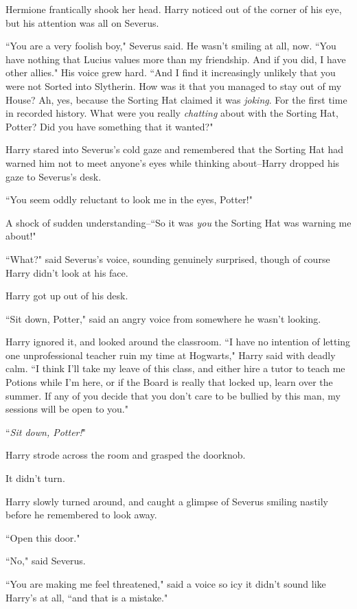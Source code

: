 Hermione frantically shook her head. Harry noticed out of the corner of his eye, but his attention was all on Severus.

``You are a very foolish boy," Severus said. He wasn't smiling at all, now. ``You have nothing that Lucius values more than my friendship. And if you did, I have other allies." His voice grew hard. ``And I find it increasingly unlikely that you were not Sorted into Slytherin. How was it that you managed to stay out of my House? Ah, yes, because the Sorting Hat claimed it was \emph{joking}. For the first time in recorded history. What were you really \emph{chatting} about with the Sorting Hat, Potter? Did you have something that it wanted?"

Harry stared into Severus's cold gaze and remembered that the Sorting Hat had warned him not to meet anyone's eyes while thinking about\---Harry dropped his gaze to Severus's desk.

``You seem oddly reluctant to look me in the eyes, Potter!"

A shock of sudden understanding\---``So it was \emph{you} the Sorting Hat was warning me about!"

``What?" said Severus's voice, sounding genuinely surprised, though of course Harry didn't look at his face.

Harry got up out of his desk.

``Sit down, Potter," said an angry voice from somewhere he wasn't looking.

Harry ignored it, and looked around the classroom. ``I have no intention of letting one unprofessional teacher ruin my time at Hogwarts," Harry said with deadly calm. ``I think I'll take my leave of this class, and either hire a tutor to teach me Potions while I'm here, or if the Board is really that locked up, learn over the summer. If any of you decide that you don't care to be bullied by this man, my sessions will be open to you."

``\emph{Sit down, Potter!}"

Harry strode across the room and grasped the doorknob.

It didn't turn.

Harry slowly turned around, and caught a glimpse of Severus smiling nastily before he remembered to look away.

``Open this door."

``No," said Severus.

``You are making me feel threatened," said a voice so icy it didn't sound like Harry's at all, ``and that is a mistake."

